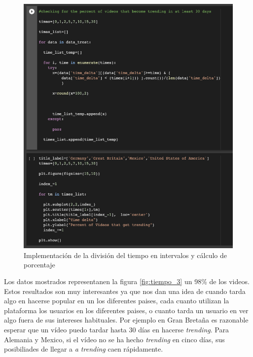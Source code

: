 \documentclass[a4paper,12pt]{article}
\begin{document}
\begin{figure}[h!]
\centering
\includegraphics[width=13cm]{plot_freq_code.png}
\caption{Implementaci\'on de la divisi\'on del tiempo en intervalos y c\'alculo de porcentaje}
\label{fig:tiempo_2}
\end{figure}



Los datos mostrados representanen la figura \ref{fig:tiempo_3}  un 98\% de los videos. Estos resultados son muy interesantes ya que nos dan una idea de cuando tarda algo en hacerse popular en un los diferentes paises, cada cuanto utilizan la plataforma los usuarios en los diferentes paises, o cuanto tarda un usuario en ver algo fuera de sus intereses habituales. Por ejemplo en Gran Breta\~na es razonable esperar que un v\'ideo puedo tardar hasta 30 d\'ias en hacerse {\itshape trending}. Para Alemania y Mexico, si el v\'ideo no se ha hecho {\itshape trending} en cinco d\'ias, sus posibiliades de llegar a {\itshape a trending} caen r\'apidamente.
\end{document}
